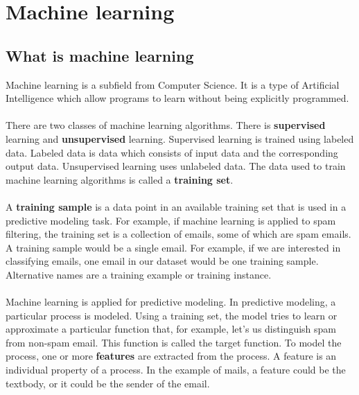
\chapter{Machine learning} %

\label{Chapter2} %

\section{What is machine learning}
Machine learning is a subfield from Computer Science. It is a type of Artificial Intelligence which allow programs to learn without being explicitly programmed. \\
\\
There are two classes of machine learning algorithms. There is \textbf{supervised} learning and \textbf{unsupervised} learning. Supervised learning is trained using labeled data. Labeled data is data which consists of input data and the corresponding output data. Unsupervised learning uses unlabeled data. The data used to train machine learning algorithms is called a \textbf{training set}.\\
\\
A \textbf{training sample} is a data point in an available training set that is used in a predictive modeling task. For example, if machine learning is applied to spam filtering, the training set is a collection of emails, some of which are spam emails. A training sample would be a single email. For example, if we are interested in classifying emails, one email in our dataset would be one training sample. Alternative names are a training example or training instance. \\
\\
Machine learning is applied for predictive modeling. In predictive modeling, a particular process is modeled. Using a training set, the model tries to learn or approximate a particular function that, for example, let's us distinguish spam from non-spam email. This function is called the target function. To model the process, one or more \textbf{features} are extracted from the process. A feature is an individual property of a process. In the example of mails, a feature could be the textbody, or it could be the sender of the email.

